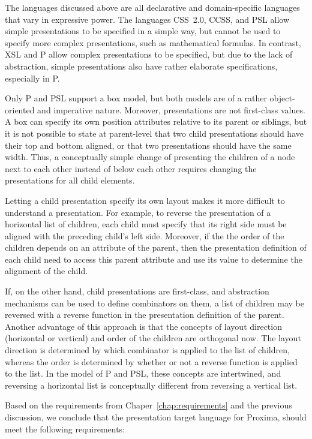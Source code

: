 
The languages discussed above are all declarative and domain-specific languages that vary in expressive power. The languages CSS~2.0, CCSS, and PSL allow simple presentations to be specified in a simple way, but cannot be used to specify more complex presentations, such as mathematical formulas. In contrast, XSL and P allow complex presentations to be specified, but due to the lack of abstraction, simple presentations also have rather elaborate specifications, especially in P. 

Only P and PSL support a box model, but both models are of a rather object-oriented and imperative nature. Moreover, presentations are not first-class values. A box can specify its own position attributes relative to its parent or siblings, but it is not possible to state at parent-level that two child presentations should have their top and bottom aligned, or that two presentations should have the same width. \bc Thus, a conceptually simple change of presenting the children of a node next to each other instead of below each other requires changing the presentations for all child elements.\ec 

Letting a child presentation specify its own layout makes it more difficult to understand a presentation. For example, to reverse the presentation of a horizontal list of children, each child must specify that its right side must be aligned with the preceding child's left side. Moreover, if the the order of the children depends on an attribute of the parent, then the presentation definition of each child need to access this parent attribute and use its value to determine the alignment of the child.

If, on the other hand, child presentations are first-class, and abstraction mechanisms can be used to define combinators on them, a list of children may be reversed with a reverse function in the presentation definition of the parent.  Another advantage of this approach is that the concepts of layout direction (horizontal or vertical) and order of the children are orthogonal now. The layout direction is determined by which combinator is applied to the list of children, whereas the order is determined by whether or not a reverse function is applied to the list. In the model of P and PSL, these concepts are intertwined, and reversing a horizontal list is conceptually different from reversing a vertical list.


Based on the requirements from Chaper~\ref{chap:requirements} and the previous discussion, we conclude that the presentation target language for Proxima, should meet the following requirements: 

